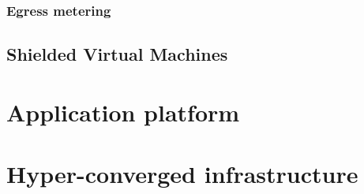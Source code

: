 \subsubsection{Egress metering}


\subsection{Shielded Virtual Machines}

\section{Application platform}

\section{Hyper-converged infrastructure}